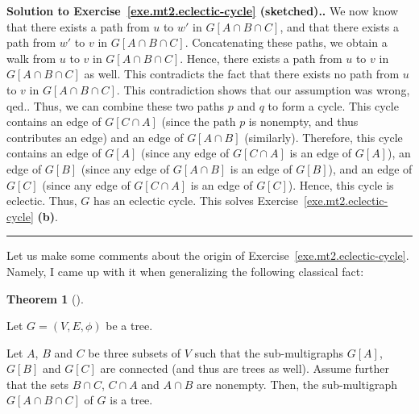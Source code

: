 \documentclass[numbers=enddot,12pt,final,onecolumn,notitlepage]{scrartcl}%
\theoremstyle{definition}
\newtheorem{theo}{Theorem}[section]
\newenvironment{theorem}[1][]
{\begin{theo}[#1]\begin{leftbar}}
{\end{leftbar}\end{theo}}
\newenvironment{proof}[1][Proof]{\noindent\textbf{#1.} }{\ \rule{0.5em}{0.5em}}
\newcommand{\tup}[1]{\left( #1 \right)}
\newcommand{\ive}[1]{\left[ #1 \right]}
\begin{document}
\begin{proof}[Solution to Exercise~\ref{exe.mt2.eclectic-cycle}
(sketched).]
{  We now know that there exists a path from $u$ to $w'$ in
  $G \ive{A \cap B \cap C}$, and that there exists a path from $w'$ to
  $v$ in $G \ive{A \cap B \cap C}$.
  Concatenating these paths, we obtain a walk from $u$ to $v$ in
  $G \ive{A \cap B \cap C}$.
  Hence, there exists a path from $u$ to $v$ in
  $G \ive{A \cap B \cap C}$ as well.
  This contradicts the fact that there exists no path from $u$ to $v$
  in $G \ive{A \cap B \cap C}$.
  This contradiction shows that our assumption was wrong, qed.}.
Thus, we can combine these two paths $p$ and $q$ to form a cycle.
This cycle contains an edge of $G \ive{C \cap A}$ (since the path $p$
is nonempty, and thus contributes an edge) and an edge of
$G \ive{A \cap B}$ (similarly).
Therefore, this cycle contains an edge of $G \ive{A}$ (since any edge
of $G \ive{C \cap A}$ is an edge of $G \ive{A}$),
an edge of $G \ive{B}$ (since any edge
of $G \ive{A \cap B}$ is an edge of $G \ive{B}$), and
an edge of $G \ive{C}$ (since any edge
of $G \ive{C \cap A}$ is an edge of $G \ive{C}$).
Hence, this cycle is eclectic.
Thus, $G$ has an eclectic cycle.
This solves Exercise~\ref{exe.mt2.eclectic-cycle} \textbf{(b)}.
\end{proof}

Let us make some comments about the origin of
Exercise~\ref{exe.mt2.eclectic-cycle}.
Namely, I came up with it when generalizing the following classical
fact:

\begin{theorem} \label{thm.mt2.eclectic-cycle.tree}
Let $G = \tup{V, E, \phi}$ be a tree.

Let $A$, $B$ and $C$ be three subsets of $V$ such that the
sub-multigraphs $G \ive{A}$, $G \ive{B}$ and $G \ive{C}$ are
connected (and thus are trees as well).
Assume further that the sets $B \cap C$, $C \cap A$ and $A \cap B$ are
nonempty.
Then, the sub-multigraph $G \ive{A \cap B \cap C}$ of $G$ is a tree.
\end{theorem}
\end{document}
